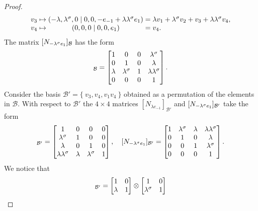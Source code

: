 \begin{proof}
\begin{equation*}
\begin{array}{r@{\;}c@{\;}c@{\;}c@{\;}l}
			v_3 & \mapsto & (-\lambda, \lambda^{\s}, 0 \mid 0,0,-e_{-1}+\lambda \lambda^{\s} 
							e_1) & = & 
								\lambda v_1 + \lambda^{\s} v_2 + v_3 + \lambda \lambda^{\s} v_4, \\
			v_4 & \mapsto & (0,0,0\mid 0,0,e_1) & = & v_4.
		\end{array}
	\end{equation*}
	The matrix $[N_{-\lambda^{\sigma} e_1}]_{\mathcal{B}}$ has the form
	\begin{equation*}
		[N_{-\lambda^{\s} e_1}]_{\mathcal{B}} = \begin{bmatrix}
			1 & 0 & 0 & \lambda^{\s} \\
			0 & 1 & 0 & \lambda \\
			\lambda & \lambda^{\s} & 1 & \lambda \lambda^{\s} \\
			0 & 0 & 0 & 1
		\end{bmatrix}.
	\end{equation*}
	Consider the basis $\mathcal{B}' = \{\ v_3, v_4, v_1 v_4\ \}$ obtained as a permutation
	of the elements in $\mathcal{B}$. With respect to $\mathcal{B}'$ the $4\times 4$
	 matrices
	$[N_{\lambda e_{-1}}]_{\mathcal{B'}}$ and 
	$[N_{-\lambda^{\sigma} e_1}]_{\mathcal{B}'}$ take the form
	\begin{equation*}
		[N_{\lambda e_{-1}}]_{\mathcal{B'}}	= \begin{bmatrix}
			1 & 0 & 0 & 0 \\
			\lambda^{\s} & 1 & 0 & 0 \\
			\lambda & 0 & 1 & 0 \\
			\lambda\lambda^{\s} & \lambda & \lambda^{\s} & 1
		\end{bmatrix},\quad 
		[N_{-\lambda^{\s} e_1}]_{\mathcal{B}'} = \begin{bmatrix}
			1 & \lambda^{\s} & \lambda & \lambda\lambda^{\s} \\
			0 & 1 & 0 & \lambda \\
			0 & 0 & 1 & \lambda^{\s} \\
			0 & 0 & 0 & 1
		\end{bmatrix}.
	\end{equation*}
	We notice that 
	\begin{equation*}
		[N_{\lambda e_{-1}}]_{\mathcal{B'}} = \begin{bmatrix}
			1 & 0 \\
			\lambda & 1 
		\end{bmatrix} \otimes
		\begin{bmatrix}
			1 & 0 \\
			\lambda^{\s} & 1

\end{bmatrix}
\end{equation*}
\end{proof}
